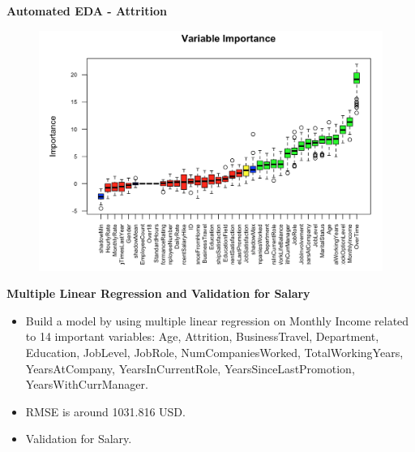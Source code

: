 \documentclass[notes,11pt]{beamer}
\begin{document}


\begin{frame}
\begin{center}
\textbf{\color{blue}\Large{Automated EDA - Attrition}}
\end{center}\medskip
\begin{figure}
\includegraphics[scale=0.40]{PIC10}
\end{figure}


\end{frame}



\begin{frame}
\begin{center}
\textbf{\color{blue}\Large{Multiple Linear Regression and Validation for Salary}}
\end{center}
\begin{itemize}
\item<1-> Build a model by using multiple linear regression on Monthly Income related to 14 important variables: Age, Attrition, BusinessTravel, Department, Education, JobLevel, JobRole, NumCompaniesWorked, TotalWorkingYears, YearsAtCompany, YearsInCurrentRole, YearsSinceLastPromotion, YearsWithCurrManager.
\item<1 -> RMSE is around 1031.816 USD.
\item<1-> Validation for Salary.
\end{itemize}

\end{frame}


\end{document}
